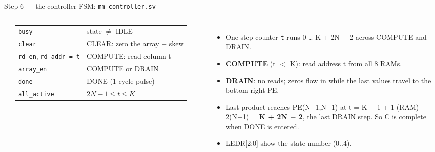 \documentclass[aspectratio=169,11pt]{beamer}
\newcommand{\file}[1]{\texttt{\textcolor{copper}{#1}}}
\newcommand{\sig}[1]{\texttt{#1}}
\begin{document}
\begin{frame}{Step 6 --- the controller FSM: \file{mm\_controller.sv}}
  \begin{columns}[T]
    \\[2mm]
    \scriptsize
    \begin{tabular}{@{}l l@{}}
      \sig{busy} & state $\neq$ IDLE \\
      \sig{clear} & CLEAR: zero the array + skew \\
      \sig{rd\_en}, \sig{rd\_addr = t} & COMPUTE: read column t \\
      \sig{array\_en} & COMPUTE or DRAIN \\
      \sig{done} & DONE (1-cycle pulse) \\
      \sig{all\_active} & $2N-1 \le t \le K$ \\
    \end{tabular}
    \small
    \begin{itemize}
      \item One step counter \sig{t} runs 0 \ldots{} K + 2N $-$ 2 across COMPUTE and DRAIN.
      \item \textbf{COMPUTE} (t $<$ K): read address t from all 8 RAMs.
      \item \textbf{DRAIN}: no reads; zeros flow in while the last values travel to
            the bottom-right PE.
      \item Last product reaches PE(N$-$1,N$-$1) at t = K $-$ 1 + 1 (RAM) + 2(N$-$1) =
            \textbf{K + 2N $-$ 2}, the last DRAIN step. So C is complete when DONE is entered.
      \item LEDR[2:0] show the state number (0..4).
    \end{itemize}
  \end{columns}
\end{frame}
\end{document}
